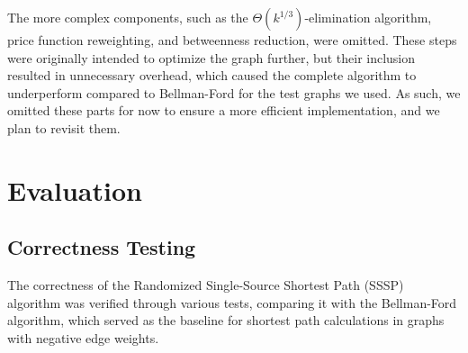 \documentclass[12pt]{article}
\begin{document}
The more complex components, such as the $\Theta(k^{1/3})$-elimination algorithm, price function reweighting, and betweenness reduction, were omitted. These steps were originally intended to optimize the graph further, but their inclusion resulted in unnecessary overhead, which caused the complete algorithm to underperform compared to Bellman-Ford for the test graphs we used. As such, we omitted these parts for now to ensure a more efficient implementation, and we plan to revisit them.

\section{Evaluation}

\subsection{Correctness Testing}

The correctness of the Randomized Single-Source Shortest Path (SSSP) algorithm was verified through various tests, comparing it with the Bellman-Ford algorithm, which served as the baseline for shortest path calculations in graphs with negative edge weights.
\end{document}
